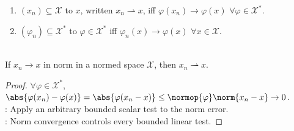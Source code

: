 \begin{definition} \label{def:weak-and-weak-star-convergence} 
\begin{enumerate}[label=(\roman*)]
\setlength{\itemsep}{0pt}
\item $(x_n)\subseteq\mathcal{X}$  to $x$, written $x_n\rightharpoonup x$, iff $\varphi(x_n)\to\varphi(x)$ $\forall\varphi\in\mathcal{X}^*$.
\item $(\varphi_n)\subseteq\mathcal{X}^*$  to $\varphi\in\mathcal{X}^*$ iff $\varphi_n(x)\to\varphi(x)$ $\forall x\in\mathcal{X}$.
\end{enumerate}
\end{definition}

\begin{proposition} \label{prop:strong-convergence-implies-weak-convergence} \\
If $x_n\to x$ in norm in a normed space $\mathcal{X}$, then $x_n\rightharpoonup x$.
\begin{proof}
$\forall\varphi\in\mathcal{X}^*$, $\abs{\varphi(x_n)-\varphi(x)}=\abs{\varphi(x_n-x)}\leq\normop{\varphi}\norm{x_n-x}\to0$.\\
: Apply an arbitrary bounded scalar test to the norm error.\\
: Norm convergence controls every bounded linear test.
\end{proof}
\end{proposition}

